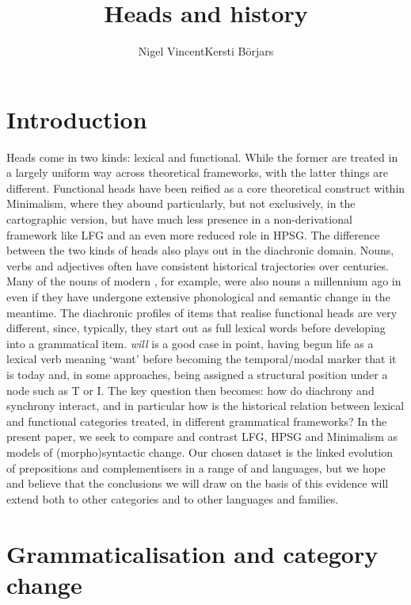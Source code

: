 \documentclass[output=paper]{langsci/langscibook}
\author{Nigel Vincent\affiliation{The University of Manchester}\lastand Kersti Börjars\affiliation{St Catherine's College, University of Oxford}}
\title{Heads and history}
\begin{document}
\glsresetall

\section{Introduction}

Heads come in two kinds: lexical and functional. While the former are treated
in a largely uniform way across theoretical frameworks, with the latter things
are different. Functional heads have been reified as a core theoretical
construct within Minimalism, where they abound particularly, but not
exclusively, in the cartographic version, but have much less presence in a
non-derivational framework like \gls{LFG} and an even more reduced role in
\gls{HPSG}. The difference between the two kinds of heads also plays out in the
diachronic domain. Nouns, verbs and adjectives often have consistent historical
trajectories over centuries. Many of the nouns of modern , for example,
were also nouns a millennium ago in  even if they have undergone
extensive phonological and semantic change in the meantime. The diachronic
profiles of items that realise functional heads are very
different, since, typically, they start out as full lexical words before
developing into a grammatical item.  \emph{will} is a good case in
point, having begun life as a lexical verb meaning \enquote*{want} before
becoming the temporal/modal marker that it is today and, in some approaches,
being assigned a structural position under a node such as T or I. The key
question then becomes: how do diachrony and synchrony interact, and in
particular how is the historical relation between lexical and functional
categories treated, in different grammatical frameworks?  In the present paper,
we seek to compare and contrast \gls{LFG}, \gls{HPSG} and Minimalism as models of (morpho)syntactic change. Our
chosen dataset is the linked evolution of prepositions and complementisers in a
range of  and  languages, but we hope and believe
that the conclusions we will draw on the basis of this evidence will extend
both to other categories and to other languages and
families.

\section{Grammaticalisation and category change}
\end{document}

